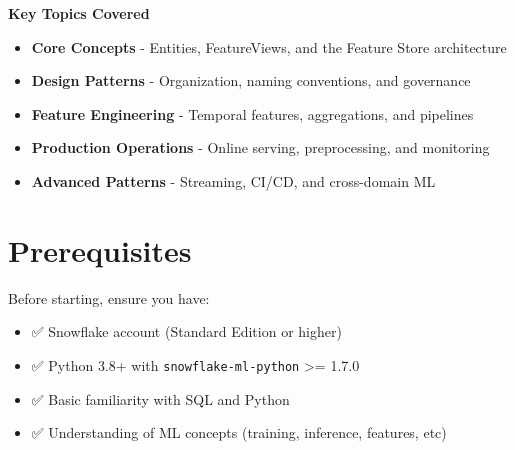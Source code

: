 \documentclass[
  letterpaper,
  DIV=11,
  numbers=noendperiod]{scrreprt}
\providecommand{\tightlist}{%
  \setlength{\itemsep}{0pt}\setlength{\parskip}{0pt}}\usepackage{longtable,booktabs,array}
\begin{document}
\begin{tcolorbox}[enhanced jigsaw, opacityback=0, rightrule=.15mm, arc=.35mm, toprule=.15mm, colframe=quarto-callout-note-color-frame, left=2mm, colback=white, breakable, bottomrule=.15mm, leftrule=.75mm]
\begin{minipage}[t]{5.5mm}
\textcolor{quarto-callout-note-color}{\faInfo}
\end{minipage}%
\begin{minipage}[t]{\textwidth - 5.5mm}

\textbf{Key Topics Covered}\vspace{2mm}

\begin{itemize}
\tightlist
\item
  \textbf{Core Concepts} - Entities, FeatureViews, and the Feature Store
  architecture
\item
  \textbf{Design Patterns} - Organization, naming conventions, and
  governance
\item
  \textbf{Feature Engineering} - Temporal features, aggregations, and
  pipelines
\item
  \textbf{Production Operations} - Online serving, preprocessing, and
  monitoring
\item
  \textbf{Advanced Patterns} - Streaming, CI/CD, and cross-domain ML
\end{itemize}

\end{minipage}%
\end{tcolorbox}

\hypertarget{prerequisites}{%
\section*{Prerequisites}\label{prerequisites}}


Before starting, ensure you have:

\begin{itemize}
\tightlist
\item
  ✅ Snowflake account (Standard Edition or higher)
\item
  ✅ Python 3.8+ with \texttt{snowflake-ml-python} \textgreater= 1.7.0
\item
  ✅ Basic familiarity with SQL and Python
\item
  ✅ Understanding of ML concepts (training, inference, features, etc)
\end{itemize}
\end{document}

